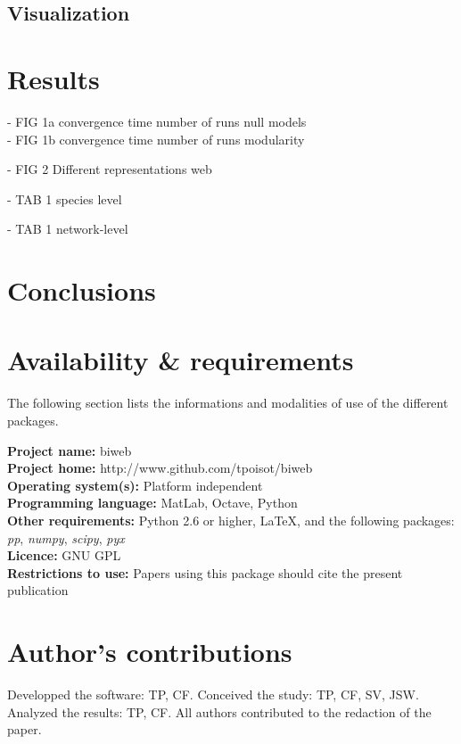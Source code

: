 \documentclass[10pt]{bmc_article}
\newenvironment{bmcformat}{\fussy\setboolean{publ}{true}}{\fussy}
\begin{document}
\begin{bmcformat}
\subsection*{Visualization}

\section*{Results}

- FIG 1a convergence time number of runs null models\\
- FIG 1b convergence time number of runs modularity

- FIG 2  Different representations web

- TAB 1  species level

- TAB 1  network-level


\section*{Conclusions}

\section*{Availability \& requirements}

The following section lists the informations and modalities of use of the different packages.

\textbf{Project name:} biweb\\
\textbf{Project home:} http://www.github.com/tpoisot/biweb\\
\textbf{Operating system(s):} Platform independent\\
\textbf{Programming language:} MatLab, Octave, Python\\
\textbf{Other requirements:} Python 2.6 or higher, LaTeX, and the following packages: \emph{pp}, \emph{numpy}, \emph{scipy}, \emph{pyx}\\
\textbf{Licence:} GNU GPL\\
\textbf{Restrictions to use:} Papers using this package should cite the present publication

\bigskip

\section*{Author's contributions}
Developped the software: TP, CF. Conceived the study: TP, CF, SV, JSW. Analyzed the results: TP, CF. All authors contributed to the redaction of the paper.    


\end{bmcformat}
\end{document}
